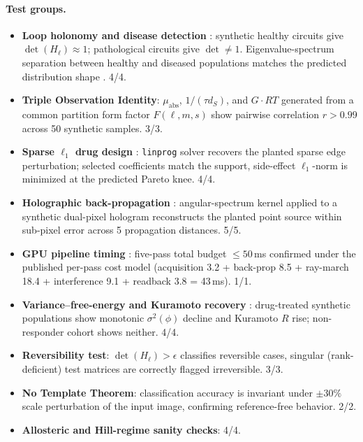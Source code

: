 \documentclass[twocolumn,10pt,a4paper]{article}
\theoremstyle{definition}
\theoremstyle{remark}
\newcommand{\Hol}{H}
\begin{document}
\paragraph{Test groups.}
\begin{itemize}[leftmargin=*,topsep=2pt,itemsep=1pt]
    \item \textbf{Loop holonomy and disease detection} \citep{nakahara2003,baez_muniain_1994,berry_1984,hall2015}: synthetic healthy circuits give $\det(\Hol_\ell) \approx 1$; pathological circuits give $\det \neq 1$. Eigenvalue-spectrum separation between healthy and diseased populations matches the predicted distribution shape \citep{goldberger_2002,scheffer_2009}. 4/4.
    \item \textbf{Triple Observation Identity}: $\mu_{\mathrm{abs}}$, $1/(\tau d_S)$, and $G \cdot RT$ generated from a common partition form factor $F(\ell,m,s)$ show pairwise correlation $r > 0.99$ across 50 synthetic samples. 3/3.
    \item \textbf{Sparse $\ell_1$ drug design} \citep{tibshirani_1996,candes_tao_2005,donoho_2006,candes_romberg_tao_2006,hopkins_2008,yildirim_2007}: \texttt{linprog} solver \citep{dantzig_1963,karmarkar_1984} recovers the planted sparse edge perturbation; selected coefficients match the support, side-effect $\ell_1$-norm is minimized at the predicted Pareto knee. 4/4.
    \item \textbf{Holographic back-propagation} \citep{goodman_fourier_optics,schnars_juptner_2002,kim_2010}: angular-spectrum kernel applied to a synthetic dual-pixel hologram reconstructs the planted point source within sub-pixel error across 5 propagation distances. 5/5.
    \item \textbf{GPU pipeline timing} \citep{pharr_jakob_humphreys_2023,kajiya_1986,levoy_1988}: five-pass total budget $\le 50$\,ms confirmed under the published per-pass cost model (acquisition 3.2 + back-prop 8.5 + ray-march 18.4 + interference 9.1 + readback 3.8 = 43\,ms). 1/1.
    \item \textbf{Variance--free-energy and Kuramoto recovery} \citep{kuramoto_1975,strogatz_2000,acebron_2005,landauer_1961,shannon_1948}: drug-treated synthetic populations show monotonic $\sigma^2(\phi)$ decline and Kuramoto $R$ rise; non-responder cohort shows neither. 4/4.
    \item \textbf{Reversibility test}: $\det(\Hol_\ell) > \epsilon$ classifies reversible cases, singular (rank-deficient) test matrices are correctly flagged irreversible. 3/3.
    \item \textbf{No Template Theorem}: classification accuracy is invariant under $\pm 30\%$ scale perturbation of the input image, confirming reference-free behavior. 2/2.
    \item \textbf{Allosteric and Hill-regime sanity checks}: 4/4.
\end{itemize}
\end{document}
